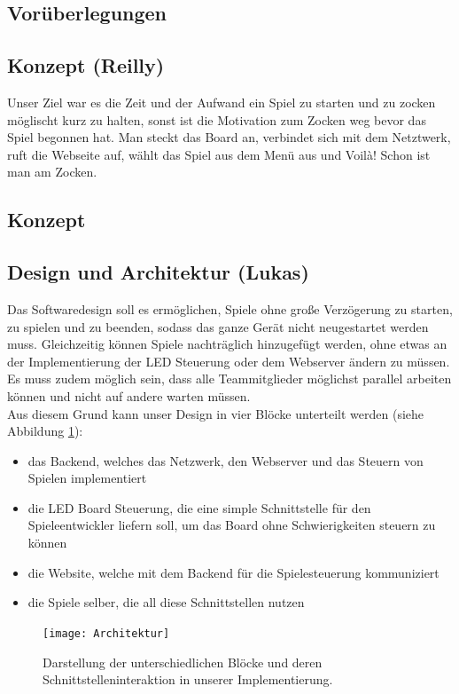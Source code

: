 \documentclass[12pt,a4paper]{article}
\begin{document}
\subsection{Vorüberlegungen }

\subsection{Konzept (Reilly)}
Unser Ziel war es die Zeit und der Aufwand ein Spiel zu starten und zu zocken möglischt kurz zu halten, sonst ist die Motivation zum Zocken weg bevor das Spiel begonnen hat. Man steckt das Board an, verbindet sich mit dem Netztwerk, ruft die Webseite auf, wählt das Spiel aus dem Menü aus und Voilà! Schon ist man am Zocken.

\subsection{Konzept}

\subsection{Design und Architektur (Lukas)}
Das Softwaredesign soll es ermöglichen, Spiele ohne große Verzögerung zu starten, zu spielen und zu beenden, sodass das ganze Gerät nicht neugestartet werden muss. Gleichzeitig können Spiele nachträglich hinzugefügt werden, ohne etwas an der Implementierung der LED Steuerung oder dem Webserver ändern zu müssen. Es muss zudem möglich sein, dass alle Teammitglieder möglichst parallel arbeiten können und nicht auf andere warten müssen.
\vspace{1ex}\\
Aus diesem Grund kann unser Design in vier Blöcke unterteilt werden (siehe Abbildung \ref{fig:Architektur}):
\begin{itemize}
\item das Backend, welches das Netzwerk, den Webserver und das Steuern von Spielen implementiert
\item die LED Board Steuerung, die eine simple Schnittstelle für den Spieleentwickler liefern soll, um das Board ohne Schwierigkeiten steuern zu können
\item die Website, welche mit dem Backend für die Spielesteuerung kommuniziert
\item die Spiele selber, die all diese Schnittstellen nutzen
\end{itemize} 
\begin{figure}[h]
\centering
\texttt{[image: Architektur]}
\caption{\label{fig:Architektur}Darstellung der unterschiedlichen Blöcke und deren Schnittstelleninteraktion in unserer Implementierung.}
\end{figure}
\end{document}
